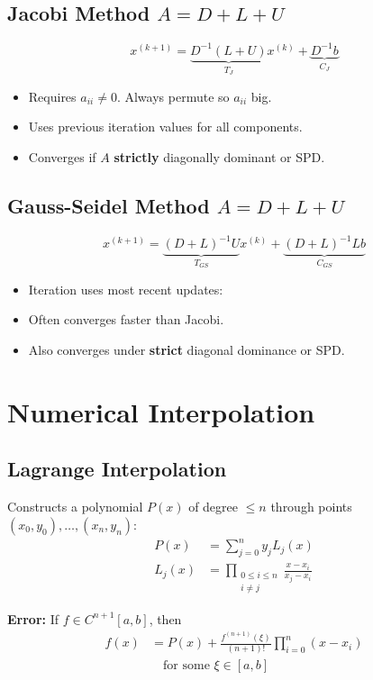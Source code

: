 \documentclass[9pt, letterpaper]{extarticle}
\begin{document}
\begin{multicols*}{3}
  \subsection{Jacobi Method $A = D + L + U$}
  \[
    x^{(k+1)} = \underbrace{D^{-1}(L+U)}_{T_J}x^{(k)} 
    + \underbrace{D^{-1}b}_{C_J}
  \]
  \begin{itemize}
    \item Requires $a_{ii} \ne 0$. Always permute so $a_{ii}$ big.
    \item Uses previous iteration values for all components.
    \item Converges if $A$ \textbf{strictly} diagonally dominant or SPD.
  \end{itemize}

  \subsection{Gauss-Seidel Method $A = D + L + U$}
  \[
    x^{(k+1)} = \underbrace{(D + L)^{-1}U}_{T_{GS}}x^{(k)} 
    + \underbrace{(D + L)^{-1}Lb}_{C_{GS}}
  \]
  \begin{itemize}
    \item Iteration uses most recent updates:
    \item Often converges faster than Jacobi.
    \item Also converges under \textbf{strict} diagonal dominance or SPD.
  \end{itemize}

  \section{Numerical Interpolation}

  \subsection{Lagrange Interpolation}
  Constructs a polynomial $P(x)$ of degree $\leq n$ through points $(x_0, y_0), \dots, (x_n, y_n)$:
  \begin{align*}
    P(x) &= \sum_{j=0}^n y_j L_j(x) \\
    L_j(x) &= \prod_{\substack{0 \le i \le n \\ i \ne j}} \frac{x - x_i}{x_j - x_i}
  \end{align*}
  
  \textbf{Error:} If $f \in C^{n+1}[a, b]$, then
  \begin{align*}
    f(x) &= P(x) + \frac{f^{(n+1)}(\xi)}{(n+1)!} \prod_{i=0}^n (x - x_i)\\ 
    &\quad \text{for some } \xi \in [a, b]
  \end{align*}
  

\end{multicols*}
\end{document}
